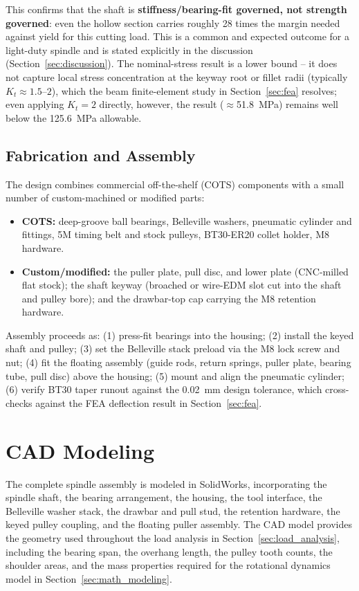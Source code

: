 \documentclass[12pt,a4paper]{report}
\begin{document}
	This confirms that the shaft is \textbf{stiffness/bearing-fit governed, not strength
		governed}: even the hollow section carries roughly 28 times the margin needed against yield
	for this cutting load. This is a common and expected outcome for a light-duty spindle and is
	stated explicitly in the discussion (Section~\ref{sec:discussion}). The nominal-stress result is a
	lower bound -- it does not capture local stress concentration at the keyway root or fillet
	radii (typically $K_t\approx1.5$--$2$), which the beam finite-element study in Section~\ref{sec:fea}
	resolves; even applying $K_t=2$ directly, however, the result ($\approx$51.8~MPa) remains
	well below the 125.6~MPa allowable.
	
	\subsection{Fabrication and Assembly}\label{sec:fab_assembly}
	The design combines commercial off-the-shelf (COTS) components with a small number of
	custom-machined or modified parts:
	\begin{itemize}
		\item \textbf{COTS:} deep-groove ball bearings, Belleville washers, pneumatic cylinder
		and fittings, 5M timing belt and stock pulleys, BT30-ER20 collet holder, M8 hardware.
		\item \textbf{Custom/modified:} the puller plate, pull disc, and lower plate
		(CNC-milled flat stock); the shaft keyway (broached or wire-EDM slot cut into the shaft
		and pulley bore); and the drawbar-top cap carrying the M8 retention hardware.
	\end{itemize}
	Assembly proceeds as: (1) press-fit bearings into the housing; (2) install the keyed shaft
	and pulley; (3) set the Belleville stack preload via the M8 lock screw and nut; (4) fit the
	floating assembly (guide rods, return springs, puller plate, bearing tube, pull disc) above
	the housing; (5) mount and align the pneumatic cylinder; (6) verify BT30 taper runout against
	the 0.02~mm design tolerance, which cross-checks against the FEA deflection result
	in Section~\ref{sec:fea}.
	
	\section{CAD Modeling}\label{sec:cad_modeling}
	The complete spindle assembly is modeled in SolidWorks, incorporating the spindle shaft,
	the bearing arrangement, the housing, the tool interface, the Belleville washer stack, the
	drawbar and pull stud, the retention hardware, the keyed pulley coupling, and the floating
	puller assembly. The CAD model provides the geometry used throughout the load analysis in
	Section~\ref{sec:load_analysis}, including the bearing span, the overhang length, the pulley tooth
	counts, the shoulder areas, and the mass properties required for the rotational dynamics
	model in Section~\ref{sec:math_modeling}.
	
\end{document}
